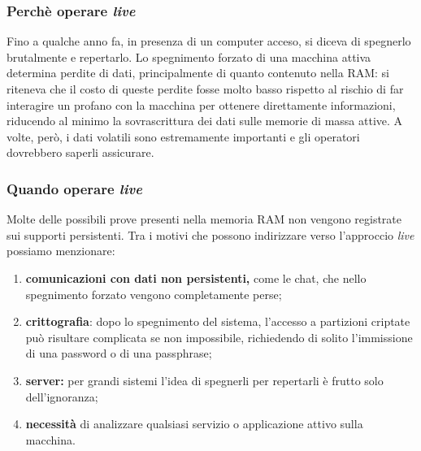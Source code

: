\documentclass[11pt]{beamer}
\begin{document}
	\begin{frame}
		\frametitle{Perchè operare \textit{live}}
		Fino a qualche anno fa, in presenza di un computer acceso, si diceva di spegnerlo brutalmente e repertarlo.
		\vfill
		Lo spegnimento forzato di una macchina attiva determina perdite di dati, principalmente di quanto contenuto nella RAM: si riteneva che il costo di queste perdite fosse molto basso rispetto al rischio di far interagire un profano con la macchina per ottenere direttamente informazioni, riducendo al minimo la sovrascrittura dei dati sulle memorie di massa attive.
		\vfill
		A volte, però, i dati volatili sono estremamente importanti e gli operatori dovrebbero saperli assicurare.
	\end{frame}
	
	\begin{frame}
		\frametitle{Quando operare \textit{live}}
			Molte delle possibili prove presenti nella memoria RAM non vengono registrate sui supporti persistenti. Tra i motivi che possono indirizzare verso l'approccio \textit{live} possiamo menzionare:
			
			\begin{enumerate}
				
				\item{\textbf{comunicazioni con dati non persistenti,}} come le chat, che nello spegnimento forzato vengono completamente perse;
				\item{\textbf{crittografia}}: dopo lo spegnimento del sistema, l'accesso a partizioni criptate può risultare complicata se non impossibile, richiedendo di solito l'immissione di una password o di una passphrase;
				\item{\textbf{server:}} per grandi sistemi l'idea di spegnerli per repertarli è frutto solo dell'ignoranza;
				\item{\textbf{necessità}} di analizzare qualsiasi servizio o applicazione attivo sulla macchina.
			\end{enumerate}
	\end{frame}
	
\end{document}
